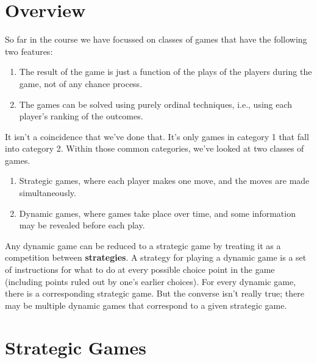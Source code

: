 
\def\mytitle{Game Theory Review}
\def\myauthor{Brian Weatherson}
\def\mydate{January, 2018}


\section{Overview}
\label{overview}

So far in the course we have focussed on classes of games that have the following two features:

\begin{enumerate}
\item{} The result of the game is just a function of the plays of the players during the game, not of any chance process.

\item{} The games can be solved using purely ordinal techniques, i.e., using each player's ranking of the outcomes.

\end{enumerate}

It isn't a coincidence that we've done that. It's only games in category 1 that fall into category 2. Within those common categories, we've looked at two classes of games.

\begin{enumerate}
\item{} Strategic games, where each player makes one move, and the moves are made simultaneously.

\item{} Dynamic games, where games take place over time, and some information may be revealed before each play.

\end{enumerate}

Any dynamic game can be reduced to a strategic game by treating it as a competition between \textbf{strategies}. A strategy for playing a dynamic game is a set of instructions for what to do at every possible choice point in the game (including points ruled out by one's earlier choices). For every dynamic game, there is a corresponding strategic game. But the converse isn't really true; there may be multiple dynamic games that correspond to a given strategic game.

\section{Strategic Games}
\label{strategicgames}

